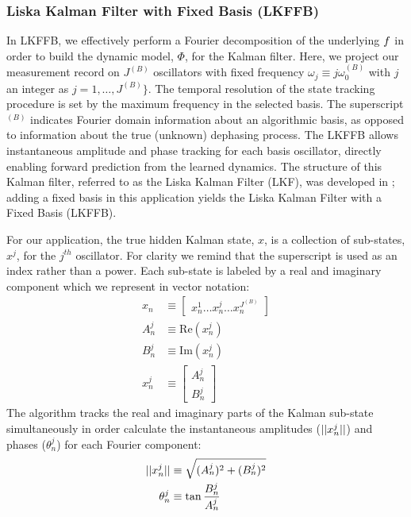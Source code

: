 \subsubsection{Liska Kalman Filter with Fixed Basis (LKFFB)}
In LKFFB, we effectively perform a Fourier decomposition of the underlying $f$ in order to build the dynamic model, $\Phi$, for the Kalman filter.   Here, we project our measurement record on $J^{(B)}$ oscillators with fixed frequency $\omega_{j}\equiv j\omega_0^{(B)}$ with $j$ an integer as $j = 1, \hdots, J^{(B)}\}$. The temporal resolution of the state tracking procedure is set by the maximum frequency in the selected basis.  The superscript $ ^{(B)}$ indicates Fourier domain information about an algorithmic basis, as opposed to information about the true (unknown) dephasing process.  The LKFFB allows instantaneous amplitude and phase tracking for each basis oscillator, directly enabling forward prediction from the learned dynamics.  The structure of this Kalman filter, referred to as the Liska Kalman Filter (LKF), was developed in \cite{livska2007}; adding a fixed basis in this application yields the Liska Kalman Filter with a Fixed Basis (LKFFB).

For our application, the true hidden Kalman state, $x$, is a collection of sub-states, $x^j$, for the $j^{th}$ oscillator. For clarity we remind that the superscript is used as an index rather than a power.  Each sub-state is labeled by a real and imaginary component which we represent in vector notation:
\begin{align}
x_n & \equiv \begin{bmatrix} x^{1}_{n} \hdots x^{j}_{n} \hdots x^{J^{(B)}}_{n} \end{bmatrix} \\
A^j_{n} & \equiv \textrm{Re}(x^{j}_{n}) \\
B^j_{n} & \equiv \textrm{Im}(x^{j}_{n}) \\
x^j_n & \equiv \begin{bmatrix} A^j_{n} \\ B^j_{n}  \end{bmatrix}
\end{align} 
The algorithm tracks the real and imaginary parts of the Kalman sub-state simultaneously in order calculate the instantaneous amplitudes ($||x^j_n||$) and phases ($\theta^{j}_{n}$)  for each Fourier component:
\begin{align}
||x^j_n|| & \equiv \sqrt{(A^j_{n})^2 + (B^j_{n})^2} \\
\theta^{j}_{n} & \equiv \tan{\frac{B^j_{n}}{A^j_{n}}}
\end{align}

